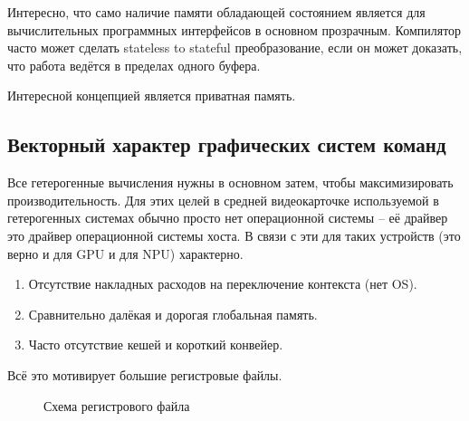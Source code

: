 Интересно, что само наличие памяти обладающей состоянием является для вычислительных программных интерфейсов в основном прозрачным. Компилятор часто может сделать stateless to stateful преобразование, если он может доказать, что работа ведётся в пределах одного буфера.

Интересной концепцией является приватная память.

\subsection{Векторный характер графических систем команд}\label{subsec:overview/logical/hw}

Все гетерогенные вычисления нужны в основном затем, чтобы максимизировать производительность.
Для этих целей в средней видеокарточке используемой в гетерогенных системах обычно просто нет операционной системы -- её драйвер это драйвер операционной системы хоста.
В связи с эти для таких устройств (это верно и для GPU и для NPU) характерно.

\begin{enumerate}
\item Отсутствие накладных расходов на переключение контекста (нет OS).
\item Сравнительно далёкая и дорогая глобальная память.
\item Часто отсутствие кешей и короткий конвейер.
\end{enumerate}

Всё это мотивирует большие регистровые файлы.

\begin{figure}[ht]
    \caption{Схема регистрового файла}\label{fig:genisa-addressing-base}
\end{figure}

